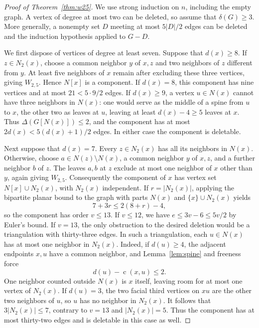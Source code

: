 \documentclass[11pt,a4paper]{article}
\theoremstyle{remark}
\newcommand{\cdeg}{\operatorname{c}}
\begin{document}
\begin{proof}[Proof of Theorem~\ref{thm:w25}]
We use strong induction on $n$, including the empty graph. A vertex of degree at most two can be deleted, so assume that $\delta(G)\ge3$. More generally, a nonempty set $D$ meeting at most $5|D|/2$ edges can be deleted and the induction hypothesis applied to $G-D$.

We first dispose of vertices of degree at least seven. Suppose that $d(x)\ge8$. If $z\in N_2(x)$, choose a common neighbor $y$ of $x,z$ and two neighbors of $z$ different from $y$. At least five neighbors of $x$ remain after excluding these three vertices, giving $W_{2,5}$. Hence $N[x]$ is a component. If $d(x)=8$, this component has nine vertices and at most $21<5\cdot9/2$ edges. If $d(x)\ge9$, a vertex $u\in N(x)$ cannot have three neighbors in $N(x)$: one would serve as the middle of a spine from $u$ to $x$, the other two as leaves at $u$, leaving at least $d(x)-4\ge5$ leaves at $x$. Thus $\Delta(G[N(x)])\le2$, and the component has at most $2d(x)<5(d(x)+1)/2$ edges. In either case the component is deletable.

Next suppose that $d(x)=7$. Every $z\in N_2(x)$ has all its neighbors in $N(x)$. Otherwise, choose $a\in N(z)\setminus N(x)$, a common neighbor $y$ of $x,z$, and a further neighbor $b$ of $z$. The leaves $a,b$ at $z$ exclude at most one neighbor of $x$ other than $y$, again giving $W_{2,5}$. Consequently the component of $x$ has vertex set $N[x]\cup N_2(x)$, with $N_2(x)$ independent. If $r=|N_2(x)|$, applying the bipartite planar bound to the graph with parts $N(x)$ and $\{x\}\cup N_2(x)$ yields
\[
7+3r\le2(8+r)-4,
\]
so the component has order $v\le13$. If $v\le12$, we have $e\le3v-6\le5v/2$ by Euler's bound. If $v=13$, the only obstruction to the desired deletion would be a triangulation with thirty-three edges. In such a triangulation, each $u\in N(x)$ has at most one neighbor in $N_2(x)$. Indeed, if $d(u)\ge4$, the adjacent endpoints $x,u$ have a common neighbor, and Lemma~\ref{lem:spine} and freeness force
\[
d(u)-\cdeg(x,u)\le2.
\]
One neighbor counted outside $N(x)$ is $x$ itself, leaving room for at most one vertex of $N_2(x)$. If $d(u)=3$, the two facial third vertices on $xu$ are the other two neighbors of $u$, so $u$ has no neighbor in $N_2(x)$. It follows that $3|N_2(x)|\le7$, contrary to $v=13$ and $|N_2(x)|=5$. Thus the component has at most thirty-two edges and is deletable in this case as well.


\end{proof}
\end{document}
